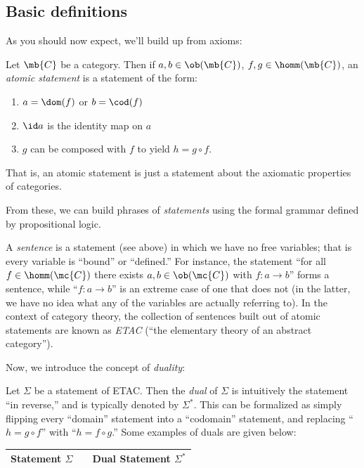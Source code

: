 \documentclass{fkbook}
\theoremstyle{snazzydefinition}
\begin{document}
\begin{adjustwidth}{1em}{1em}
  \subsection{Basic definitions}
  As you should now expect, we'll build up from axioms:
  \begin{definition}
    Let $\mb{C}$ be a category. Then if $a,b \in \ob(\mb{C})$, $f,g
    \in \homm(\mb{C})$, an \emph{atomic statement} is a statement of
    the form:
    \begin{enumerate}
      \item $a = \dom(f)$ or $b = \cod(f)$
      \item $\id a$ is the identity map on $a$
      \item $g$ can be composed with $f$ to yield $h = g \circ f$.
    \end{enumerate}
    That is, an atomic statement is just a statement about the
    axiomatic properties of categories.
  \end{definition}
  From these, we can build phrases of \emph{statements} using the
  formal grammar defined by propositional logic.
  \begin{definition}[Sentences]
    A \emph{sentence} is a statement (see above) in which we have no
    free variables; that is every variable is ``bound'' or
    ``defined.'' For instance, the statement ``for all $f \in
    \homm(\mc{C})$ there exists $a,b \in \ob(\mc{C})$ with $f : a \to
    b$'' forms a sentence, while ``$f : a \to b$'' is an extreme case
    of one that does not (in the latter, we have no idea what any of
    the variables are actually referring to). In the context of
    category theory, the collection of sentences built out of atomic
    statements are known as \emph{ETAC} (``the elementary theory of an
    abstract category'').
  \end{definition}
  Now, we introduce the concept of \emph{duality}:
  \begin{definition}[Duality]
    Let $\Sigma$ be a statement of ETAC. Then the \emph{dual} of
    $\Sigma$ is intuitively the statement ``in reverse,'' and is
    typically denoted by $\Sigma^*$. This can be formalized as simply
    flipping every ``domain'' statement into a ``codomain'' statement,
    and replacing ``$h = g \circ f$'' with ``$h = f \circ g$.'' Some
    examples of duals are given below:
    \begin{table}[H]
      \centering
      \begin{tabular}{@{}lll@{}}
        \toprule
        Statement $\Sigma$ && Dual Statement $\Sigma^*$ \\ \midrule

\end{tabular}
\end{table}
\end{definition}
\end{adjustwidth}
\end{document}
